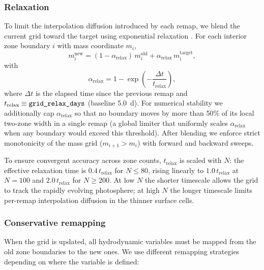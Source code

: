 \documentclass[twocolumn,linenumbers]{aastex701}
\begin{document}
\subsubsection{Relaxation}

To limit the interpolation diffusion introduced by each remap, we blend the current grid toward the target using exponential relaxation \citep{BrackbillSaltzman1982}. For each interior zone boundary $i$ with mass coordinate $m_i$,
\begin{equation}
m_i^{\mathrm{new}} = (1 - \alpha_{\mathrm{relax}})\, m_i^{\mathrm{old}} + \alpha_{\mathrm{relax}}\, m_i^{\mathrm{target}},
\end{equation}
with
\begin{equation}
\alpha_{\mathrm{relax}} = 1 - \exp\!\left(-\frac{\Delta t}{t_{\mathrm{relax}}}\right),
\end{equation}
where $\Delta t$ is the elapsed time since the previous remap and $t_{\mathrm{relax}} \equiv \texttt{grid\_relax\_\-days}$ (baseline 5.0~d). For numerical stability we additionally cap $\alpha_{\mathrm{relax}}$ so that no boundary moves by more than 50\% of its local two-zone width in a single remap (a global limiter that uniformly scales $\alpha_{\mathrm{relax}}$ when any boundary would exceed this threshold). After blending we enforce strict monotonicity of the mass grid ($m_{i+1} > m_i$) with forward and backward sweeps.

To ensure convergent accuracy across zone counts, $t_{\mathrm{relax}}$ is scaled with $N$: the effective relaxation time is $0.4\,t_{\mathrm{relax}}$ for $N \le 80$, rising linearly to $1.0\,t_{\mathrm{relax}}$ at $N = 100$ and $2.0\,t_{\mathrm{relax}}$ for $N \ge 200$. At low $N$ the shorter timescale allows the grid to track the rapidly evolving photosphere; at high $N$ the longer timescale limits per-remap interpolation diffusion in the thinner surface cells.

\subsubsection{Conservative remapping}
\label{sec:remap}

When the grid is updated, all hydrodynamic variables must be mapped from the old zone boundaries to the new ones. We use different remapping strategies depending on where the variable is defined:
\end{document}
